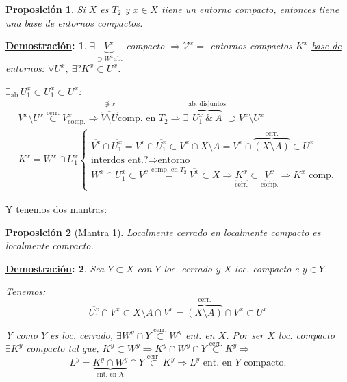 \documentclass[10pt,a4paper,openright]{book}
\theoremstyle{break}
\newtheorem*{prop}{Proposición}
\newtheorem*{demo}{\underline{Demostración}:}
\begin{document}
\begin{prop}
Si $X$ es $T_2$ y $x \in X$ tiene un entorno compacto, entonces tiene una base de entornos compactos.
\end{prop}
\begin{demo}
    $\exists \underbrace{V^x}_{\supset W^x \text{ab.}}$ compacto $\Rightarrow \mathcal{V}^x =$ { entornos compactos $K^x$} \underline{base de entornos}: $\forall U^x,\ \exists?K^x \subset U^x$.

    $\exists_{\text{ab.}} U_1^x \subset \overline{U_1^x} \subset U^x$:
    \begin{gather*}
        V^x\setminus U^x \stackrel{\text{cerr.}}{\subset} V_{\text{comp.}}^x \Rightarrow \overbrace{V \setminus U}^{\not\ni x} \text{comp. en } T_2 \Rightarrow \exists \overbrace{U_1^x\ \&\ A}^{\text{ab. disjuntos}} \supset V^x \setminus U^x\\
        K^x = \overline{W^x \cap U_1^x} \begin{cases}
            \overline{V^x} \cap \overline{U_1^x} = V^x \cap \overline{U_1^x} \subset V^x \cap \overline{X \setminus A} = V^x \cap \overbrace{\left( X \setminus A \right)}^{\text{cerr.}} \subset U^x\\
            \text{interdos ent.?} \Rightarrow \text{entorno}\\
            W^x \cap U_1^x \subset V^x \stackrel{\text{comp. en } T_2}{=} \overline{V^x} \subset X \Rightarrow \underbrace{K^x}_{\text{cerr.}} \subset \underbrace{V^x}_{\text{comp.}} \Rightarrow K^x \text{ comp.} 
        \end{cases}  
    \end{gather*}
\end{demo}

Y tenemos dos mantras:
\begin{prop}[Mantra 1]
Localmente cerrado en localmente compacto es localmente compacto. 
\end{prop}
\begin{demo}
    Sea $Y \subset X$ con $Y$ loc. cerrado y $X$ loc. compacto e $y \in Y$.

    Tenemos:
    \[
    \overline{U_1^x} \cap V^x \subset \overline{X \setminus A} \cap V^x = \overbrace{\left( X \setminus A \right)}^{\text{cerr.}} \cap V^x \subset U^x
    \]

    Y como $Y$ es loc. cerrado, $\exists W^y \cap Y \stackrel{\text{cerr.}}{\subset} W^y$ ent. en $X$. Por ser $X$ loc. compacto $\exists K^y$ compacto tal que, $K^y \subset W^y \Rightarrow K^y \cap W^y \cap Y \stackrel{\text{cerr.}}{\subset} K^y \Rightarrow$
    \[
    L^y = \underbrace{K^y \cap W^y}_{\text{ent. en } X} \cap Y \stackrel{\text{cerr.}}{\subset} K^y \Rightarrow L^y \text{ ent. en } Y \text{ compacto.}  
    \]
\end{demo}
\end{document}
